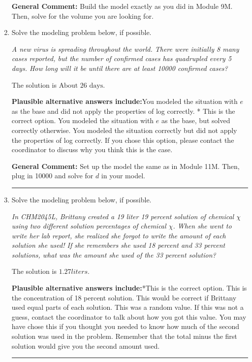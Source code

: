 \documentclass{extbook}[14pt]
\newcommand{\litem}[1]{\item #1

\rule{\textwidth}{0.4pt}}
\begin{document}
\begin{enumerate}
{\textbf{General Comment:} Build the model exactly as you did in Module 9M. Then, solve for the volume you are looking for.
}
\litem{
Solve the modeling problem below, if possible.

\begin{center}
    \textit{ A new virus is spreading throughout the world. There were initially 8 many cases reported, but the number of confirmed cases has quadrupled every 5 days. How long will it be until there are at least 10000 confirmed cases? }
\end{center}
The solution is \( \text{About } 26 \text{ days} \).\begin{enumerate}[label=\Alph*.]
\textbf{Plausible alternative answers include:}You modeled the situation with $e$ as the base and did not apply the properties of log correctly.
* This is the correct option.
You modeled the situation with $e$ as the base, but solved correctly otherwise.
You modeled the situation correctly but did not apply the properties of log correctly.
If you chose this option, please contact the coordinator to discuss why you think this is the case.
\end{enumerate}

\textbf{General Comment:} Set up the model the same as in Module 11M. Then, plug in 10000 and solve for $d$ in your model.
}
\litem{
Solve the modeling problem below, if possible.

\begin{center}
    \textit{ In CHM2045L, Brittany created a 19 liter 19 percent solution of chemical $\chi$ using two different solution percentages of chemical $\chi$. When she went to write her lab report, she realized she forgot to write the amount of each solution she used! If she remembers she used 18 percent and 33 percent solutions, what was the amount she used of the 33 percent solution? }
\end{center}
The solution is \( 1.27 liters \).\begin{enumerate}[label=\Alph*.]
\textbf{Plausible alternative answers include:}*This is the correct option.
This is the concentration of 18 percent solution.
This would be correct if Brittany used equal parts of each solution.
This was a random value. If this was not a guess, contact the coordinator to talk about how you got this value.
You may have chose this if you thought you needed to know how much of the second solution was used in the problem. Remember that the total minus the first solution would give you the second amount used.
\end{enumerate}

}
\end{enumerate}
\end{document}
